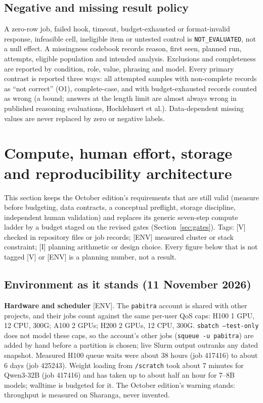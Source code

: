 \documentclass[10pt,a4paper]{article}
\newcommand{\tg}[1]{\textsc{[#1]}}
\newcommand{\NE}{\texttt{NOT\_EVALUATED}}
\begin{document}
\subsection{Negative and missing result policy}
A zero-row job, failed hook, timeout, budget-exhausted or format-invalid response, infeasible cell, ineligible item
or untested control is \NE{}, not a null effect. A missingness codebook records reason, first seen, planned run,
attempts, eligible population and intended analysis. Exclusions and completeness are reported by condition, role,
value, phrasing and model. Every primary contrast is reported three ways: all attempted samples with non-complete
records as ``not correct'' (O1), complete-case, and with budget-exhausted records counted as wrong (a bound; answers
at the length limit are almost always wrong in published reasoning evaluations, Hochlehnert et al.). Data-dependent
missing values are never replaced by zero or negative labels.

\section{Compute, human effort, storage and reproducibility architecture}
\label{sec:compute}

This section keeps the October edition's requirements that are still valid (measure before budgeting, data
contracts, a conceptual preflight, storage discipline, independent human validation) and replaces its generic
seven-step compute ladder by a budget staged on the revised gates (Section~\ref{sec:gates}). Tags: \tg{V} checked
in repository files or job records; \tg{ENV} measured cluster or stack constraint; \tg{I} planning arithmetic or
design choice. Every figure below that is not tagged \tg{V} or \tg{ENV} is a planning number, not a result.

\subsection{Environment as it stands (11 November 2026)}
\label{sec:compute-env}

\textbf{Hardware and scheduler} \tg{ENV}. The \texttt{pabitra} account is shared with other projects, and their
jobs count against the same per-user QoS caps: H100 1 GPU, 12 CPU, 300G; A100 2 GPUs; H200 2 GPUs, 12 CPU, 300G.
\texttt{sbatch --test-only} does not model these caps, so the account's other jobs (\texttt{squeue -u pabitra})
are added by hand before a partition is chosen; live Slurm output outranks any dated snapshot. Measured H100 queue
waits were about 38 hours (job 417416) to about 6 days (job 425243). Weight loading from \texttt{/scratch} took
about 7 minutes for Qwen3-32B (job 417416) and has taken up to about half an hour for 7--8B models; walltime is
budgeted for it. The October edition's warning stands: throughput is measured on Sharanga, never invented.
\end{document}
